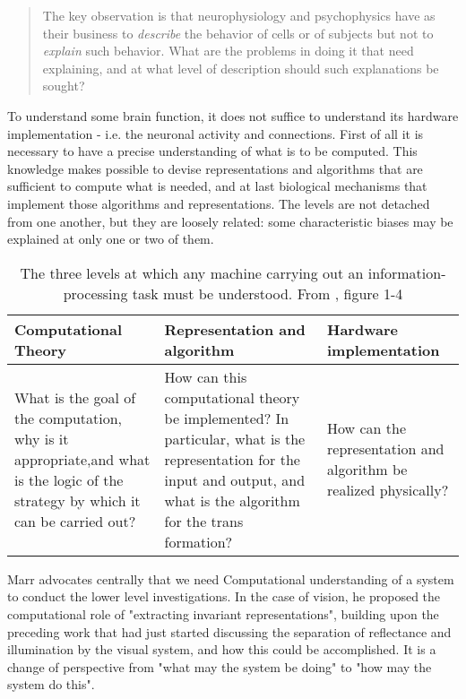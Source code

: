     \begin{quote}
    The key observation is that neurophysiology and psychophysics have as their business to \textit{describe} the behavior of cells or of subjects but not to \textit{explain} such behavior. What are the problems in doing it that need explaining, and at what level of description should such explanations be sought?
    \end{quote}
    
    To understand some brain function, it does not suffice to understand its hardware implementation - i.e. the neuronal activity and connections. First of all it is necessary to have a precise understanding of what is to be computed. This knowledge makes possible to devise representations and algorithms that are sufficient to compute what is needed, and at last biological mechanisms that implement those algorithms and representations. The levels are not detached from one another, but they are loosely related: some characteristic biases may be explained at only one or two of them. 
    
    \begin{table}[]
        \centering
        \begin{tabular}{p{4cm}p{4cm}p{4cm}}
        \hline \vspace{.2cm}
            Computational Theory & Representation and algorithm & Hardware implementation\\\hline
            
            What is the goal of the computation, why is it appropriate,and what is the logic of the strategy by which it can be carried out? & 
            
            How can this computational theory be implemented? In particular, what is the representation for the input and output, and what is the algorithm for the trans formation? &
            
            How can the representation and algorithm be realized physically?
            \\\hline
        \end{tabular}
        \caption{The three levels at which any machine carrying out an information-processing task must be understood. From \cite{marr1982vision}, figure 1-4}
        \label{tab:three_levels}
    \end{table}
    
    Marr advocates centrally that we need Computational understanding of a system to conduct the lower level investigations. In the case of vision, he proposed the computational role of "extracting invariant representations", building upon the preceding work that had just started discussing the separation of reflectance and illumination by the visual system, and how this could be accomplished. It is a change of perspective from "what may the system be doing" to "how may the system do this".
    
